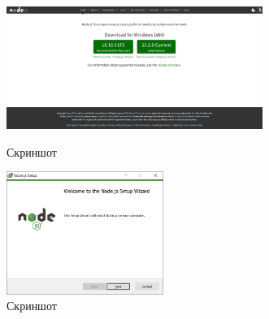 \begin{figure}[!phtb]
    \centering

    \begin{minipage}{0.49\textwidth}
        \centering

        \includegraphics[height=4cm]
        {images/install/node-js/1.png}

        \caption{Скриншот}

        \label{fig:nodejs_1}
    \end{minipage}
    \begin{minipage}{0.49\textwidth}
        \centering

        \includegraphics[height=4cm]
        {images/install/node-js/2.png}

        \caption{Скриншот}

        \label{fig:nodejs_2}
    \end{minipage}
\end{figure}

